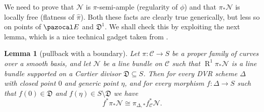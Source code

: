\documentclass[11pt]{amsart}
\renewcommand{\to}{\rightarrow}
\newcommand{\cC}{\mathcal C}
\newcommand{\R}{\operatorname{R}}
\newcommand{\dvr}{\Delta}
\theoremstyle{plain}
\newtheorem{lem}[thm]{Lemma}
\theoremstyle{definition}
\begin{document}
We need to prove that $\mathcal N$ is $\pi$-semi-ample (regularity of $\phi$) and that $\pi_*\mathcal N$ is locally free (flatness of $\hat\pi$). Both these facts are clearly true generically, but less so on points of $\pazocal E$ and $\mathfrak D^1$. We shall check this by exploiting the next lemma, which is a nice technical gadget taken from \cite{RSPW}.
\begin{lem}[pullback with a boundary]\label{DVR}
Let $\pi\colon\cC\to S$ be a proper family of curves over a smooth basis, and let $\mathcal N$ be a line bundle on $\cC$ such that $\R^1\pi_*\mathcal N$ is a line bundle supported on a Cartier divisor $\mathfrak D\subseteq S$. Then for every DVR scheme $\dvr$ with closed point $0$ and generic point $\eta$, and for every morphism $f\colon \dvr\to S$ such that $f(0)\in\mathfrak D$ and $f(\eta)\in S\setminus\mathfrak D$ we have
\[f^*\pi_*\mathcal N\cong \pi_{\dvr,*}f_\cC^*\mathcal N.\]
\end{lem}
\end{document}
